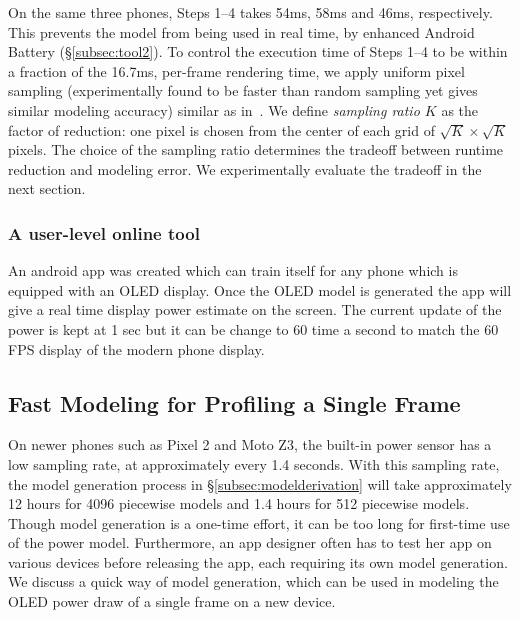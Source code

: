 {
On the same three phones,
Steps 1--4 takes
54ms, 58ms and 46ms, respectively.
This prevents the model from being used in real time, \eg by 
enhanced Android Battery (\S\ref{subsec:tool2}).
To control the execution time of Steps 1--4 
to be within a fraction of the 16.7ms, \ie per-frame
rendering time, we apply uniform pixel sampling (experimentally found to
be faster than random sampling yet gives similar modeling accuracy) similar as 
in~\cite{dong2009current}. We define {\em sampling ratio $K$} as the factor
of reduction: one pixel is chosen from the center of each grid of
$\sqrt{K}\times\sqrt{K}$ pixels. The choice of the sampling ratio determines
the tradeoff between runtime reduction and modeling error. We experimentally
evaluate the tradeoff in the next section.
}

\subsubsection{A user-level online tool}

An android app was created which can train itself for any phone which is equipped with an
OLED display. Once the OLED model is generated the app will give a real time display
power estimate on the screen. The current update of the power is kept at 1 sec but it can
be change to 60 time a second to match the 60 FPS display of the modern phone display.
\fi





\subsection{Fast Modeling for Profiling a Single Frame}
\label{subsec:fast}

On newer phones such as Pixel 2 and Moto Z3, the built-in power sensor has a low
sampling rate, at approximately every 1.4 seconds. With this sampling rate,
the model generation process in \S\ref{subsec:modelderivation} will take approximately 12 hours for 4096
piecewise models and 1.4 hours for 512 piecewise models.
Though model generation is a one-time effort,
it can be too long for first-time use of the power model.
Furthermore, an app designer often has to test her app on various
devices before releasing the app, each requiring its own model generation.
We discuss a quick way of model generation, which can be used
in modeling the OLED power draw of a single frame on a new device.

